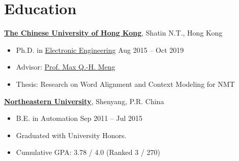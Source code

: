 
\section{\sc Education}

{\bf \href{http://www.cuhk.edu.hk/english/index.html}{The Chinese University of Hong Kong}}, Shatin N.T., Hong Kong
\begin{itemize}
    \item[] Ph.D. in \href{https://www.ee.cuhk.edu.hk/}{Electronic Engineering} \hfill Aug 2015 -- Oct 2019
    \item[] Advisor: \href{http://www.ee.cuhk.edu.hk/~qhmeng/about.html}{Prof. Max Q.-H. Meng}
    \item[] Thesis: Research on Word Alignment and Context Modeling for NMT
\end{itemize}

{\bf \href{http://english.neu.edu.cn/}{Northeastern University}}, Shenyang, P.R. China
\begin{itemize}
    \item[] B.E. in Automation \hfill Sep 2011 -- Jul 2015
    \item[] Graduated with University Honors.
    \item[] Cumulative GPA: 3.78 / 4.0 (Ranked 3 / 270)
\end{itemize}
